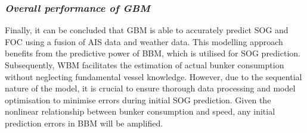 \subsubsection*{\emph{Overall performance of GBM}}

Finally, it can be concluded that GBM is able to accurately predict SOG and FOC using a fusion of AIS data and weather data. This modelling approach benefits from the predictive power of BBM, which is utilised for SOG prediction. Subsequently, WBM facilitates the estimation of actual bunker consumption without neglecting fundamental vessel knowledge.  However, due to the sequential nature of the model, it is crucial to ensure thorough data processing and model optimisation to minimise errors during initial SOG prediction. Given the nonlinear relationship between bunker consumption and speed, any initial prediction errors in BBM will be amplified.\\













